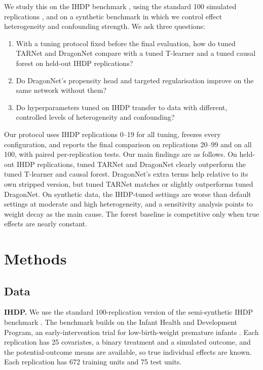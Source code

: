 \documentclass[10pt]{article}
\begin{document}
We study this on the IHDP benchmark \citep{hill2011bayesian}, using the standard 100 simulated replications \citep{shalit2017estimating}, and on a synthetic benchmark in which we control effect heterogeneity and confounding strength. We ask three questions:
\begin{enumerate}
  \item With a tuning protocol fixed before the final evaluation, how do tuned TARNet and DragonNet compare with a tuned T-learner and a tuned causal forest on held-out IHDP replications?
  \item Do DragonNet's propensity head and targeted regularisation improve on the same network without them?
  \item Do hyperparameters tuned on IHDP transfer to data with different, controlled levels of heterogeneity and confounding?
\end{enumerate}

Our protocol uses IHDP replications 0--19 for all tuning, freezes every configuration, and reports the final comparison on replications 20--99 and on all 100, with paired per-replication tests. Our main findings are as follows. On held-out IHDP replications, tuned TARNet and DragonNet clearly outperform the tuned T-learner and causal forest. DragonNet's extra terms help relative to its own stripped version, but tuned TARNet matches or slightly outperforms tuned DragonNet. On synthetic data, the IHDP-tuned settings are worse than default settings at moderate and high heterogeneity, and a sensitivity analysis points to weight decay as the main cause. The forest baseline is competitive only when true effects are nearly constant.

\section{Methods}

\subsection{Data}

\textbf{IHDP.} We use the standard 100-replication version of the semi-synthetic IHDP benchmark \citep{hill2011bayesian,shalit2017estimating}. The benchmark builds on the Infant Health and Development Program, an early-intervention trial for low-birth-weight premature infants \citep{brooksgunn1992effects}. Each replication has 25 covariates, a binary treatment and a simulated outcome, and the potential-outcome means are available, so true individual effects are known. Each replication has 672 training units and 75 test units.
\end{document}
